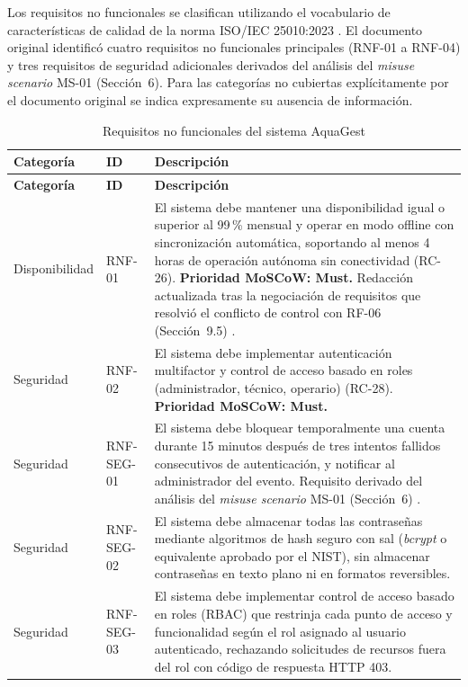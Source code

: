 \documentclass[12pt,a4paper]{article}
\begin{document}
Los requisitos no funcionales se clasifican utilizando el vocabulario de
características de calidad de la norma ISO/IEC 25010:2023
\cite{ISO25010:2023}. El documento original identificó cuatro requisitos no
funcionales principales (RNF-01 a RNF-04) y tres requisitos de seguridad
adicionales derivados del análisis del \textit{misuse scenario} MS-01
(Sección~6). Para las categorías no cubiertas explícitamente por el documento
original se indica expresamente su ausencia de información.

\begin{longtable}{|p{2.6cm}|p{1.4cm}|p{9.8cm}|}
\caption{Requisitos no funcionales del sistema AquaGest} \\
\hline
\textbf{Categoría} & \textbf{ID} & \textbf{Descripción} \\
\hline
\endfirsthead
\hline
\textbf{Categoría} & \textbf{ID} & \textbf{Descripción} \\
\hline
\endhead

Disponibilidad & RNF-01 &
El sistema debe mantener una disponibilidad igual o superior al 99\,\% mensual
y operar en modo offline con sincronización automática, soportando al menos
4 horas de operación autónoma sin conectividad (RC-26). \textbf{Prioridad
MoSCoW: Must.} Redacción actualizada tras la negociación de requisitos que
resolvió el conflicto de control con RF-06 (Sección~9.5) \cite{Pohl2010}. \\
\hline

Seguridad & RNF-02 &
El sistema debe implementar autenticación multifactor y control de acceso
basado en roles (administrador, técnico, operario) (RC-28). \textbf{Prioridad
MoSCoW: Must.} \\
\hline

Seguridad & RNF-SEG-01 &
El sistema debe bloquear temporalmente una cuenta durante 15 minutos después
de tres intentos fallidos consecutivos de autenticación, y notificar al
administrador del evento. Requisito derivado del análisis del \textit{misuse
scenario} MS-01 (Sección~6) \cite{Pohl2010,SWEBOK2024}. \\
\hline

Seguridad & RNF-SEG-02 &
El sistema debe almacenar todas las contraseñas mediante algoritmos de hash
seguro con sal (\textit{bcrypt} o equivalente aprobado por el NIST), sin
almacenar contraseñas en texto plano ni en formatos reversibles. \\
\hline

Seguridad & RNF-SEG-03 &
El sistema debe implementar control de acceso basado en roles (RBAC) que
restrinja cada punto de acceso y funcionalidad según el rol asignado al
usuario autenticado, rechazando solicitudes de recursos fuera del rol con
código de respuesta HTTP 403. \\
\hline


\end{longtable}
\end{document}
